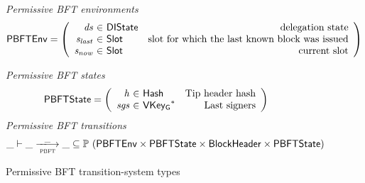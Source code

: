 \documentclass[11pt,a4paper]{article}
\newcommand{\powerset}[1]{\mathbb{P}~#1}
\newcommand{\var}[1]{\mathit{#1}}
\newcommand{\type}[1]{\mathsf{#1}}
\newcommand{\trans}[2]{\xlongrightarrow[\textsc{#1}]{#2}}
\newcommand{\seqof}[1]{#1^{*}}
\newcommand{\Hash}{\type{Hash}}  %
\newcommand{\Slot}{\type{Slot}}
\newcommand{\VKeyGen}{\type{VKey_G}}
\newcommand{\DelegState}{\type{DIState}}
\begin{document}
\begin{figure}[ht]
  \emph{Permissive BFT environments}
  \begin{equation*}
    \PBFTEnv =
    \left(
      \begin{array}{r@{~\in~}lr}
        \var{ds} & \DelegState & \text{delegation state} \\
        \var{s_{last}} & \Slot & \text{slot for which the last known block was issued} \\
        \var{s_{now}} & \Slot & \text{current slot} \\
      \end{array}
    \right)
  \end{equation*}

  \emph{Permissive BFT states}
  \begin{equation*}
    \PBFTState =
    \left(
      \begin{array}{r@{~\in~}lr}
        \var{h} & \Hash & \text{Tip header hash} \\
        \var{sgs} & \seqof{\VKeyGen} & \text{Last signers}
      \end{array}
    \right)
  \end{equation*}
  \emph{Permissive BFT transitions}
  \begin{equation*}
    \_ \vdash \var{\_} \trans{pbft}{\_} \var{\_} \subseteq
    \powerset (\PBFTEnv \times \PBFTState \times \Bhead \times \PBFTState)
  \end{equation*}
  \caption{Permissive BFT transition-system types}
  \label{fig:ts-types:pbft}
\end{figure}
\end{document}
